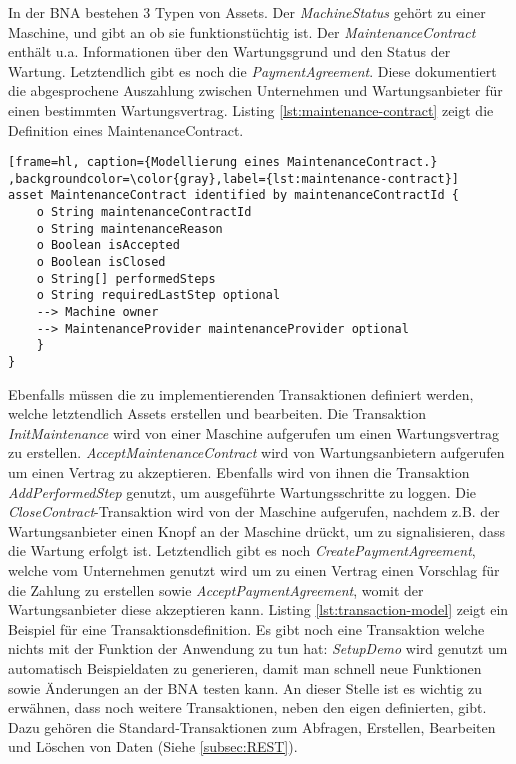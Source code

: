 In der BNA bestehen 3 Typen von Assets. Der \textit{MachineStatus} gehört zu einer Maschine, und gibt an ob sie funktionstüchtig ist. Der \textit{MaintenanceContract} enthält u.a. Informationen über den Wartungsgrund und den Status der Wartung. Letztendlich gibt es noch die \textit{PaymentAgreement}. Diese dokumentiert die abgesprochene Auszahlung zwischen Unternehmen und Wartungsanbieter für einen bestimmten Wartungsvertrag. Listing \ref{lst:maintenance-contract} zeigt die Definition eines MaintenanceContract.

\begin{lstfloat}
\begin{lstlisting}[frame=hl, caption={Modellierung eines MaintenanceContract.} ,backgroundcolor=\color{gray},label={lst:maintenance-contract}]
asset MaintenanceContract identified by maintenanceContractId {
    o String maintenanceContractId
    o String maintenanceReason
    o Boolean isAccepted
    o Boolean isClosed
    o String[] performedSteps
    o String requiredLastStep optional
    --> Machine owner
    --> MaintenanceProvider maintenanceProvider optional
    }
}
\end{lstlisting} 
\end{lstfloat}

Ebenfalls müssen die zu implementierenden Transaktionen definiert werden, welche letztendlich Assets erstellen und bearbeiten. Die Transaktion \textit{InitMaintenance} wird von einer Maschine aufgerufen um einen Wartungsvertrag zu erstellen. \textit{AcceptMaintenanceContract} wird von Wartungsanbietern aufgerufen um einen Vertrag zu akzeptieren. Ebenfalls wird von ihnen die Transaktion \textit{AddPerformedStep} genutzt, um ausgeführte Wartungsschritte zu loggen. Die \textit{CloseContract}-Transaktion wird von der Maschine aufgerufen, nachdem z.B. der Wartungsanbieter einen Knopf an der Maschine drückt, um zu signalisieren, dass die Wartung erfolgt ist. Letztendlich gibt es noch \textit{CreatePaymentAgreement}, welche vom Unternehmen genutzt wird um zu einen Vertrag einen Vorschlag für die Zahlung zu erstellen sowie \textit{AcceptPaymentAgreement}, womit der Wartungsanbieter diese akzeptieren kann. Listing \ref{lst:transaction-model} zeigt ein Beispiel für eine Transaktionsdefinition. Es gibt noch eine Transaktion welche nichts mit der Funktion der Anwendung zu tun hat: \textit{SetupDemo} wird genutzt um automatisch Beispieldaten zu generieren, damit man schnell neue Funktionen sowie Änderungen an der BNA testen kann. An dieser Stelle ist es wichtig zu erwähnen, dass noch weitere Transaktionen, neben den eigen definierten, gibt. Dazu gehören die Standard-Transaktionen zum Abfragen, Erstellen, Bearbeiten und Löschen von Daten (Siehe \ref{subsec:REST}).

